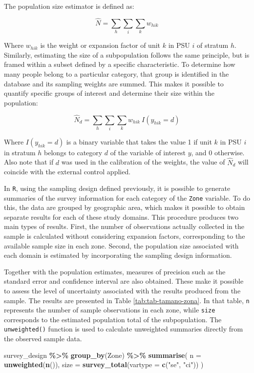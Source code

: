 \documentclass[
  english,
  12pt,
]{book}
\newenvironment{Shaded}{\begin{snugshade}}{\end{snugshade}}
\newcommand{\AttributeTok}[1]{\textcolor[rgb]{0.13,0.29,0.53}{#1}}
\newcommand{\FunctionTok}[1]{\textcolor[rgb]{0.13,0.29,0.53}{\textbf{#1}}}
\newcommand{\NormalTok}[1]{#1}
\newcommand{\SpecialCharTok}[1]{\textcolor[rgb]{0.81,0.36,0.00}{\textbf{#1}}}
\newcommand{\StringTok}[1]{\textcolor[rgb]{0.31,0.60,0.02}{#1}}
\begin{document}
The population size estimator is defined as:

\[
\hat{N} = \sum_{h} \sum_{i} \sum_{k} w_{hik}
\]

Where \(w_{hik}\) is the weight or expansion factor of unit \(k\) in PSU \(i\) of stratum \(h\). Similarly, estimating the size of a subpopulation follows the same principle, but is framed within a subset defined by a specific characteristic. To determine how many people belong to a particular category, that group is identified in the database and its sampling weights are summed. This makes it possible to quantify specific groups of interest and determine their size within the population:

\[
\hat{N}_d = \sum_{h} \sum_{i} \sum_{k} w_{hik} \ I(y_{hik}=d)
\]

Where \(I(y_{hik}=d)\) is a binary variable that takes the value 1 if unit \(k\) in PSU \(i\) in stratum \(h\) belongs to category \(d\) of the variable of interest \(y\), and 0 otherwise. Also note that if \(d\) was used in the calibration of the weights, the value of \(\hat{N}_d\) will coincide with the external control applied.

In \texttt{R}, using the sampling design defined previously, it is possible to generate summaries of the survey information for each category of the \texttt{Zone} variable. To do this, the data are grouped by geographic area, which makes it possible to obtain separate results for each of these study domains. This procedure produces two main types of results. First, the number of observations actually collected in the sample is calculated without considering expansion factors, corresponding to the available sample size in each zone. Second, the population size associated with each domain is estimated by incorporating the sampling design information.

Together with the population estimates, measures of precision such as the standard error and confidence interval are also obtained. These make it possible to assess the level of uncertainty associated with the results produced from the sample. The results are presented in Table \ref{tab:tab-tamano-zona}. In that table, \texttt{n} represents the number of sample observations in each zone, while \texttt{size} corresponds to the estimated population total of the subpopulation. The \texttt{unweighted()} function is used to calculate unweighted summaries directly from the observed sample data.

\begin{Shaded}
\begin{Highlighting}[]
\NormalTok{survey\_design }\SpecialCharTok{\%\textgreater{}\%}
  \FunctionTok{group\_by}\NormalTok{(Zone) }\SpecialCharTok{\%\textgreater{}\%}
  \FunctionTok{summarise}\NormalTok{(}
    \AttributeTok{n =} \FunctionTok{unweighted}\NormalTok{(}\FunctionTok{n}\NormalTok{()),}
    \AttributeTok{size =} \FunctionTok{survey\_total}\NormalTok{(}\AttributeTok{vartype =} \FunctionTok{c}\NormalTok{(}\StringTok{"se"}\NormalTok{, }\StringTok{"ci"}\NormalTok{))}
\NormalTok{  )}
\end{Highlighting}
\end{Shaded}
\end{document}
